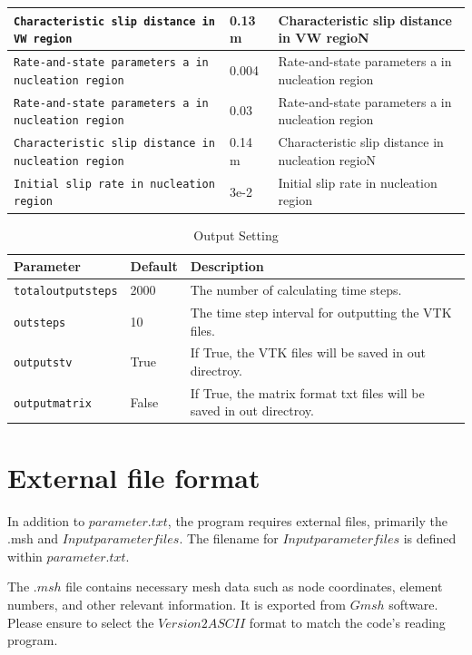 \documentclass[a4paper,12pt]{article}
\begin{document}
\begin{table}[h!]
\begin{tabular}{|m{3.5cm}|m{2cm}|m{9cm}|}
        \hline
\texttt{Characteristic slip distance in VW region} & 0.13 m& Characteristic slip distance in VW regioN\\
        \hline
\texttt{Rate-and-state parameters a in nucleation region} & 0.004& Rate-and-state parameters a in nucleation region\\
        \hline
\texttt{Rate-and-state parameters a in nucleation region} & 0.03& Rate-and-state parameters a in nucleation region\\
        \hline
\texttt{Characteristic slip distance in nucleation  region} & 0.14 m& Characteristic slip distance in nucleation  regioN\\
        \hline
\texttt{Initial slip rate in nucleation region} & 3e-2& Initial slip rate in nucleation region\\
        \hline
    \end{tabular}
\end{table}

\begin{table}[h!]
    \centering
    \caption{Output Setting}
    \label{tab:Output Setting}
    \begin{tabular}{|m{3.5cm}|m{2cm}|m{9cm}|}
        \hline
        \textbf{Parameter} & \textbf{Default} & \textbf{Description} \\
	\hline
\texttt{totaloutputsteps} & 2000& The number of calculating time steps.\\
        \hline
\texttt{outsteps} & 10& The time step interval for outputting the VTK files.\\
        \hline
\texttt{outputstv} & True& If True, the VTK files will be saved in out directroy.\\
        \hline
\texttt{outputmatrix} & False& If True, the matrix format txt files will be saved in out directroy.\\
        \hline

    \end{tabular}
\end{table}

\section{External file format}
In addition to $parameter.txt$, the program requires external files, primarily the .msh and $Inputparameter files$. The filename for $Inputparameter files$ is defined within $parameter.txt$.

The $.msh$ file contains necessary mesh data such as node coordinates, element numbers, and other relevant information. It is exported from $Gmsh$ software. Please ensure to select the $Version 2 ASCII$ format to match the code's reading program. 
\end{document}
